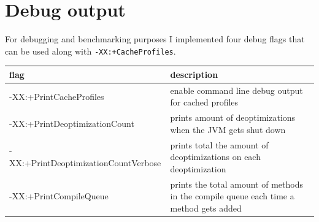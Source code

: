\section{Debug output}
\label{s:debugoutput}
For debugging and benchmarking purposes I implemented four debug flags that can be used along with \texttt{-XX:+CacheProfiles}.
\begin{table}[ht]
  \centering
  \label{t:debugflags}
  \begin{center}
    \begin{tabular}{| l | p{9.0cm} |}
       \hline
       \textbf{flag} & \textbf{description} \\ \hline\hline
       -XX:+PrintCacheProfiles & enable command line debug output for cached profiles\\ \hline
       -XX:+PrintDeoptimizationCount & prints amount of deoptimizations when the JVM gets shut down\\ \hline
       -XX:+PrintDeoptimizationCountVerbose & prints total the amount of deoptimizations on each deoptimization\\ \hline
       -XX:+PrintCompileQueue & prints the total amount of methods in the compile queue each time a method gets added \\ \hline
    \end{tabular}
  \end{center}
\end{table}

 
